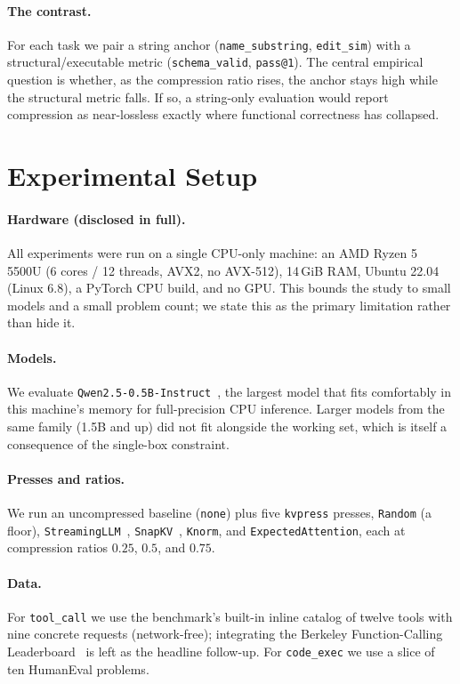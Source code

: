 \documentclass[11pt]{article}
\begin{document}
\paragraph{The contrast.} For each task we pair a string anchor (\texttt{name\_substring},
\texttt{edit\_sim}) with a structural/executable metric (\texttt{schema\_valid}, \texttt{pass@1}). The
central empirical question is whether, as the compression ratio rises, the anchor stays high while the
structural metric falls. If so, a string-only evaluation would report compression as near-lossless
exactly where functional correctness has collapsed.

\section{Experimental Setup}
\label{sec:setup}

\paragraph{Hardware (disclosed in full).} All experiments were run on a single CPU-only machine: an
AMD Ryzen 5 5500U (6 cores / 12 threads, AVX2, no AVX-512), 14\,GiB RAM, Ubuntu 22.04 (Linux 6.8), a
PyTorch CPU build, and no GPU. This bounds the study to small models and a small problem count; we
state this as the primary limitation rather than hide it.

\paragraph{Models.} We evaluate \texttt{Qwen2.5-0.5B-Instruct}~\cite{qwen2.5}, the largest model that
fits comfortably in this machine's memory for full-precision CPU inference. Larger models from the
same family (1.5B and up) did not fit alongside the working set, which is itself a consequence of the
single-box constraint.

\paragraph{Presses and ratios.} We run an uncompressed baseline (\texttt{none}) plus five
\texttt{kvpress} presses, \texttt{Random} (a floor), \texttt{StreamingLLM}~\cite{xiao2024streamingllm},
\texttt{SnapKV}~\cite{li2024snapkv}, \texttt{Knorm}, and \texttt{ExpectedAttention}, each at
compression ratios $0.25$, $0.5$, and $0.75$.

\paragraph{Data.} For \texttt{tool\_call} we use the benchmark's built-in inline catalog of twelve
tools with nine concrete requests (network-free); integrating the Berkeley Function-Calling
Leaderboard~\cite{yan2024bfcl} is left as the headline follow-up. For \texttt{code\_exec} we use a
slice of ten HumanEval problems.
\end{document}
